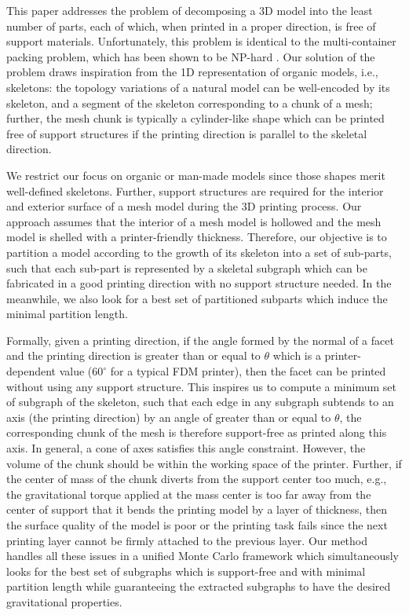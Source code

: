 This paper addresses the problem of decomposing a 3{D} model into the least number of parts, each of which, when printed in a proper direction, is free of support materials. Unfortunately, this problem is identical to the multi-container packing problem, which has been shown to be NP-hard \cite{Fukunaga:2007}. Our solution of the problem draws inspiration from the 1{D} representation of organic models, i.e., skeletons: the topology variations of a natural model can be well-encoded by its skeleton, and a segment of the skeleton corresponding to a chunk of a mesh; further, the mesh chunk is typically a cylinder-like shape which can be printed free of support structures if the printing direction is parallel to the skeletal direction.

We restrict our focus on organic or man-made models since those shapes merit well-defined skeletons. Further, support structures are required for the interior and exterior surface of a mesh model during the 3{D} printing process. Our approach assumes that the interior of a mesh model is hollowed and the mesh model is shelled with a printer-friendly thickness. Therefore, our objective is to partition a model according to the growth of its skeleton into a set of sub-parts, such that each sub-part is represented by a skeletal subgraph which can be fabricated in a good printing direction with no support structure needed. In the meanwhile, we also look for a best set of partitioned subparts which induce the minimal partition length.

Formally, given a printing direction, if the angle formed by the normal of a facet and the printing direction is greater than or equal to $\theta$ which is a printer-dependent value ($60^{\circ}$ for a typical FDM printer), then the facet can be printed without using any support structure. This inspires us to compute a minimum set of subgraph of the skeleton, such that each edge in any subgraph subtends to an axis (the printing direction) by an angle of greater than or equal to $\theta$, the corresponding chunk of the mesh is therefore support-free as printed along this axis. In general, a cone of axes satisfies this angle constraint. However, the volume of the chunk should be within the working space of the printer. Further, if the center of mass of the chunk diverts from the support center too much, e.g., the gravitational torque applied at the mass center is too far away from the center of support that it bends the printing model by a layer of thickness, then the surface quality of the model is poor or the printing task fails since the next printing layer cannot be firmly attached to the previous layer. Our method handles all these issues in a unified Monte Carlo framework which simultaneously looks for the best set of subgraphs which is support-free and with minimal partition length while guaranteeing the extracted subgraphs to have the desired gravitational properties.

